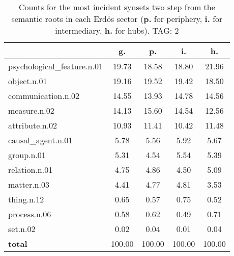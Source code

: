 \begin{table}[h!]
\begin{center}
\begin{tabular}{| l | c | c | c | c |}\hline
 & g. & p. & i. & h. \\\hline
psychological\_feature.n.01 & 19.73  & 18.58  & 18.80  & 21.96 \\\hline
object.n.01 & 19.16  & 19.52  & 19.42  & 18.50 \\\hline
communication.n.02 & 14.55  & 13.93  & 14.78  & 14.56 \\\hline
measure.n.02 & 14.13  & 15.60  & 14.54  & 12.56 \\\hline
attribute.n.02 & 10.93  & 11.41  & 10.42  & 11.48 \\\hline
causal\_agent.n.01 & 5.78  & 5.56  & 5.92  & 5.67 \\\hline
group.n.01 & 5.31  & 4.54  & 5.54  & 5.39 \\\hline
relation.n.01 & 4.75  & 4.86  & 4.50  & 5.09 \\\hline
matter.n.03 & 4.41  & 4.77  & 4.81  & 3.53 \\\hline
thing.n.12 & 0.65  & 0.57  & 0.75  & 0.52 \\\hline
process.n.06 & 0.58  & 0.62  & 0.49  & 0.71 \\\hline
set.n.02 & 0.02  & 0.04  & 0.01  & 0.04 \\\hline
{{\bf total}} & 100.00  & 100.00  & 100.00  & 100.00 \\\hline
\end{tabular}
\caption{Counts for the most incident synsets two step from the semantic roots in each Erd\"os sector ({\bf p.} for periphery, {\bf i.} for intermediary, {\bf h.} for hubs). TAG: 2}
\end{center}
\end{table}